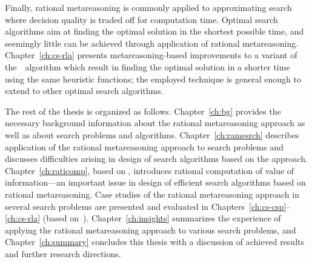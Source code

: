 Finally, rational metareasoning is commonly applied to approximating
search where decision quality is traded off for computation time. Optimal
search algorithms aim at finding the optimal solution in the shortest
possible time, and seemingly little can be achieved through
application of rational metareasoning.  Chapter~\ref{ch:cs-rla}
presents metareasoning-based improvements to a variant of
the~\astar~algorithm which result in finding the optimal solution in a
shorter time using the same heuristic functions; the employed
technique is general enough to extend to other optimal
search algorithms.

The rest of the thesis is organized as follows. Chapter~\ref{ch:bg}
provides the necessary background information about the rational
metareasoning approach as well as about search problems and
algorithms. Chapter~\ref{ch:ramesrch} describes application of the
rational metareasoning approach to search problems and discusses
difficulties arising in design of search algorithms based on the
approach. Chapter~\ref{ch:raticomp}, based
on \cite{TolpinShimony.raticomp}, introduces rational computation of
value of information---an important issue in design of efficient
search algorithms based on rational metareasoning. Case studies of the
rational metareasoning approach in several search problems are
presented and evaluated in Chapters~\ref{ch:cs-csp}--\ref{ch:cs-rla} (based
on~\cite{TolpinShimony.csp,TolpinShimony.mcts,HayRussellTolpinShimony.selecting,TolpinEtAl.rla}).
Chapter~\ref{ch:insights} summarizes the experience of applying 
the rational metareasoning approach to various search problems, and
Chapter~\ref{ch:summary} concludes this thesis with a discussion of
achieved results and further research directions.

